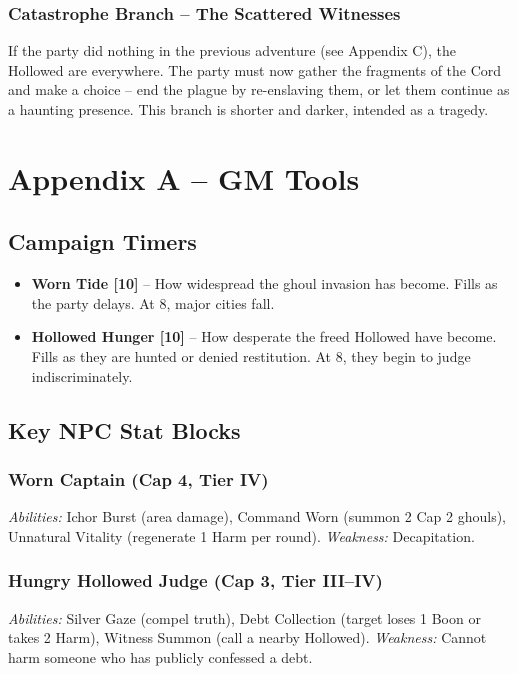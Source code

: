 \documentclass[10pt,twoside]{book}
\begin{document}
\subsection{Catastrophe Branch -- The Scattered Witnesses}
If the party did nothing in the previous adventure (see Appendix C), the Hollowed are everywhere. The party must now gather the fragments of the Cord and make a choice -- end the plague by re-enslaving them, or let them continue as a haunting presence. This branch is shorter and darker, intended as a tragedy.

\chapter{Appendix A -- GM Tools}

\section{Campaign Timers}
\begin{itemize}
\item \textbf{Worn Tide [10]} -- How widespread the ghoul invasion has become. Fills as the party delays. At 8, major cities fall.
\item \textbf{Hollowed Hunger [10]} -- How desperate the freed Hollowed have become. Fills as they are hunted or denied restitution. At 8, they begin to judge indiscriminately.
\end{itemize}

\section{Key NPC Stat Blocks}
\subsection{Worn Captain (Cap 4, Tier IV)}
\textit{Abilities:} Ichor Burst (area damage), Command Worn (summon 2 Cap 2 ghouls), Unnatural Vitality (regenerate 1 Harm per round). \textit{Weakness:} Decapitation.

\subsection{Hungry Hollowed Judge (Cap 3, Tier III--IV)}
\textit{Abilities:} Silver Gaze (compel truth), Debt Collection (target loses 1 Boon or takes 2 Harm), Witness Summon (call a nearby Hollowed). \textit{Weakness:} Cannot harm someone who has publicly confessed a debt.
\end{document}
